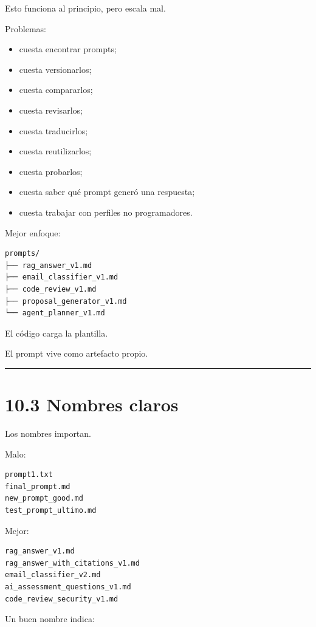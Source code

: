 Esto funciona al principio, pero escala mal.

Problemas:

\begin{itemize}
\tightlist
\item
  cuesta encontrar prompts;
\item
  cuesta versionarlos;
\item
  cuesta compararlos;
\item
  cuesta revisarlos;
\item
  cuesta traducirlos;
\item
  cuesta reutilizarlos;
\item
  cuesta probarlos;
\item
  cuesta saber qué prompt generó una respuesta;
\item
  cuesta trabajar con perfiles no programadores.
\end{itemize}

Mejor enfoque:

\begin{lstlisting}
prompts/
├── rag_answer_v1.md
├── email_classifier_v1.md
├── code_review_v1.md
├── proposal_generator_v1.md
└── agent_planner_v1.md
\end{lstlisting}

El código carga la plantilla.

El prompt vive como artefacto propio.

\begin{center}\rule{0.5\linewidth}{0.5pt}\end{center}

\section{10.3 Nombres claros}\label{nombres-claros}

Los nombres importan.

Malo:

\begin{lstlisting}
prompt1.txt
final_prompt.md
new_prompt_good.md
test_prompt_ultimo.md
\end{lstlisting}

Mejor:

\begin{lstlisting}
rag_answer_v1.md
rag_answer_with_citations_v1.md
email_classifier_v2.md
ai_assessment_questions_v1.md
code_review_security_v1.md
\end{lstlisting}

Un buen nombre indica:

